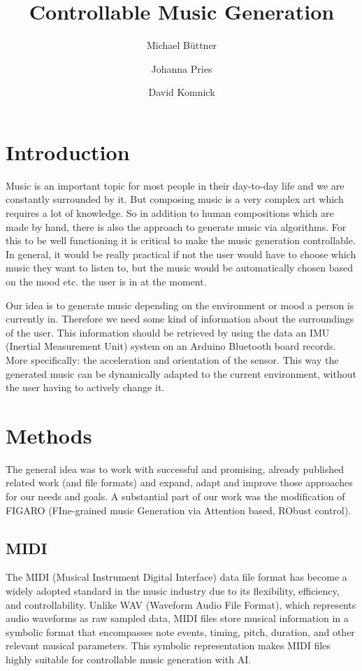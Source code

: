 \documentclass{article}
\title{\textbf{Controllable Music Generation}}
\author{Michael Büttner \and Johanna Pries \and David Komnick}
\date{\vspace{-3ex}}
\begin{document}
\maketitle

\section{Introduction}
Music is an important topic for most people in their day-to-day life and we are constantly surrounded by it. But composing music is a very complex art which requires a lot of knowledge. So in addition to human compositions which are made by hand, there is also the approach to generate music via algorithms. For this to be well functioning it is critical to make the music generation controllable. In general, it would be really practical if not the user would have to choose which music they want to listen to, but the music would be automatically chosen based on the mood etc. the user is in at the moment.

Our idea is to generate music depending on the environment or mood a person is currently in. Therefore we need some kind of information about the surroundings of the user. This information should be retrieved by using the data an IMU (Inertial Measurement Unit) system on an Arduino Bluetooth board records. More specifically: the acceleration and orientation of the sensor. This way the generated music can be dynamically adapted to the current environment, without the user having to actively change it.

\section{Methods}
The general idea was to work with successful and promising, already published related work (and file formats) and expand, adapt and improve those approaches for our needs and goals. A substantial part of our work was the modification of FIGARO (FIne-grained music Generation via Attention based, RObust control).


\subsection{MIDI}
The MIDI (Musical Instrument Digital Interface) data file format has become a widely adopted standard in the music industry due to its flexibility, efficiency, and controllability. Unlike WAV (Waveform Audio File Format), which represents audio waveforms as raw sampled data, MIDI files store musical information in a symbolic format that encompasses note events, timing, pitch, duration, and other relevant musical parameters. This symbolic representation makes MIDI files highly suitable for controllable music generation with AI.
\end{document}
